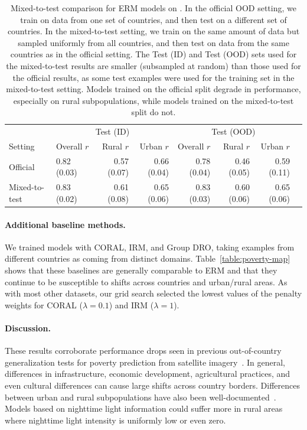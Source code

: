 \begin{table}[!h]
  \caption{Mixed-to-test comparison for ERM models on \PovertyMap.
  In the official OOD setting, we train on data from one set of countries, and then test on a different set of countries.
  In the mixed-to-test setting, we train on the same amount of data but sampled uniformly from all countries, and then test on data from the same countries as in the official setting.
  The Test (ID) and Test (OOD) sets used for the mixed-to-test results are smaller (subsampled at random) than those used for the official results, as some test examples were used for the training set in the mixed-to-test setting.
  Models trained on the official split degrade in performance, especially on rural subpopulations,
  while models trained on the mixed-to-test split do not.}
  \centering
\begin{tabular} {l l r r r r r r}
\toprule
& \multicolumn{3}{c}{Test (ID)} & \multicolumn{3}{c}{Test (OOD)} \\
Setting & Overall $r$ & Rural $r$ & Urban $r$ & Overall $r$ & Rural $r$ & Urban $r$\\
\midrule
  Official & 0.82 (0.03) & 0.57 (0.07) & 0.66 (0.04) & 0.78 (0.04) & 0.46 (0.05) & 0.59 (0.11) \\
  Mixed-to-test & 0.83 (0.02) & 0.61 (0.08) & 0.65 (0.06) & 0.83 (0.03) & 0.60 (0.06) & 0.65 (0.06)\\
\bottomrule
\end{tabular}
\label{table:poverty-map-compare}
\end{table}

\paragraph{Additional baseline methods.}
We trained models with CORAL, IRM, and Group DRO, taking examples from different countries as coming from distinct domains.
Table~\ref{table:poverty-map} shows that these baselines are generally comparable to ERM and that they continue to be susceptible to shifts across countries and urban/rural areas.
As with most other datasets, our grid search selected the lowest values of the penalty weights for CORAL ($\lambda = 0.1$) and IRM ($\lambda = 1$).

\paragraph{Discussion.}
These results corroborate performance drops seen in previous out-of-country generalization tests for poverty prediction from satellite imagery~\citep{jean2016combining}.
In general, differences in infrastructure, economic development, agricultural practices, and even cultural differences can cause large shifts across country borders.
Differences between urban and rural subpopulations have also been well-documented~\citep{jean2016combining,yeh2020poverty}. Models based on nighttime light information could suffer more in rural areas where nighttime light intensity is uniformly low or even zero.

